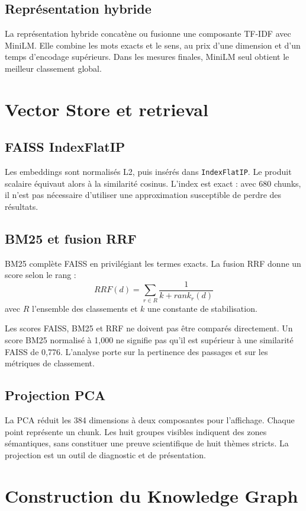 \documentclass[12pt,a4paper,oneside]{report}
\newcommand{\tech}[1]{\texttt{#1}}
\begin{document}
\subsection{Représentation hybride}
La représentation hybride concatène ou fusionne une composante TF-IDF avec MiniLM. Elle combine les mots exacts et le sens, au prix d'une dimension et d'un temps d'encodage supérieurs. Dans les mesures finales, MiniLM seul obtient le meilleur classement global.

\section{Vector Store et retrieval}
\subsection{FAISS IndexFlatIP}
Les embeddings sont normalisés L2, puis insérés dans \tech{IndexFlatIP}. Le produit scalaire équivaut alors à la similarité cosinus. L'index est exact : avec 680 chunks, il n'est pas nécessaire d'utiliser une approximation susceptible de perdre des résultats.

\subsection{BM25 et fusion RRF}
BM25 complète FAISS en privilégiant les termes exacts. La fusion RRF donne un score selon le rang :
\begin{equation}
RRF(d) = \sum_{r \in R} \frac{1}{k + rank_r(d)}
\end{equation}
avec $R$ l'ensemble des classements et $k$ une constante de stabilisation.

Les scores FAISS, BM25 et RRF ne doivent pas être comparés directement. Un score BM25 normalisé à 1,000 ne signifie pas qu'il est supérieur à une similarité FAISS de 0,776. L'analyse porte sur la pertinence des passages et sur les métriques de classement.

\subsection{Projection PCA}
La PCA réduit les 384 dimensions à deux composantes pour l'affichage. Chaque point représente un chunk. Les huit groupes visibles indiquent des zones sémantiques, sans constituer une preuve scientifique de huit thèmes stricts. La projection est un outil de diagnostic et de présentation.

\section{Construction du Knowledge Graph}
\end{document}
